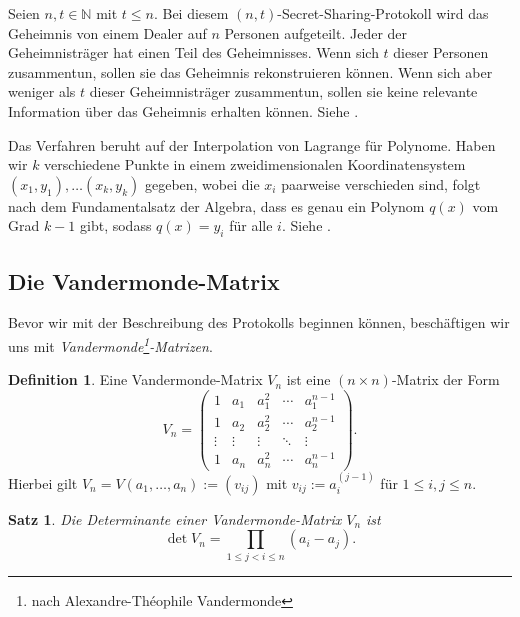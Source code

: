 \documentclass[12pt, a4paper, oneside, titlepage]{report}
\newcommand{\N}{\mathds{N}}
\newtheorem{satz}[lemma]{Satz}
\theoremstyle{definition}
\newtheorem{def1}[lemma]{Definition}
\begin{document}
	Seien $ n, t \in \N $ mit $ t \leq n $. Bei diesem $ (n,t) $-Secret-Sharing-Protokoll wird das Geheimnis von einem Dealer auf $ n $ Personen aufgeteilt. Jeder der Geheimnisträger hat einen Teil des Geheimnisses. Wenn sich $ t $ dieser Personen zusammentun, sollen sie das Geheimnis rekonstruieren können. Wenn sich aber weniger als $ t $ dieser Geheimnisträger zusammentun, sollen sie keine relevante Information über das Geheimnis erhalten können. Siehe \cite{buchmann}.
	
	Das Verfahren beruht auf der Interpolation von Lagrange für Polynome. Haben wir $ k $ verschiedene Punkte in einem zweidimensionalen Koordinatensystem $ (x_1, y_1), \dots (x_k, y_k) $ gegeben, wobei die $ x_i $ paarweise verschieden sind, folgt nach dem Fundamentalsatz der Algebra, dass es genau ein Polynom $ q(x) $ vom Grad $ k - 1 $ gibt, sodass $ q(x) =y_i $ für alle $ i $. Siehe \cite{shamir}.
	
	\subsection{Die Vandermonde-Matrix}
	
	Bevor wir mit der Beschreibung des Protokolls beginnen können, beschäftigen wir uns mit \emph{Vandermonde\footnote{nach Alexandre-Théophile Vandermonde}-Matrizen}.
	
	\begin{def1}
		Eine Vandermonde-Matrix $ V_n $ ist eine $ (n \times n) $-Matrix der Form
	$$V_n =
	\begin{pmatrix}
	1 & a_1 & a_1^2 & \cdots & a_1^{n-1} \\
	1 & a_2 & a_2^2 & \cdots & a_2^{n-1} \\
	\vdots & \vdots & \vdots & \ddots & \vdots \\     
	1 & a_n & a_n^2 & \cdots & a_n^{n-1}
	\end{pmatrix}.$$
	Hierbei gilt $V_n = V(a_1, \dots, a_n) := (v_{ij}) $ mit $ v_{ij} := a_i^{(j-1)} $ für $ 1 \leq i, j \leq n$.
	\end{def1}
	\begin{satz}
		Die Determinante einer Vandermonde-Matrix $ V_n $ ist
		$$ \det V_n = \prod_{1 \leq j < i \leq n} (a_i - a_j). $$
	\end{satz}
\end{document}
